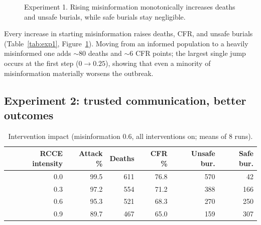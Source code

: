 \documentclass[11pt]{article}
\begin{document}
\begin{figure}[h]
\centering
{}
\caption{Experiment 1. Rising misinformation monotonically increases deaths and unsafe burials, while safe burials stay negligible.}
\label{fig:exp1}
\end{figure}

Every increase in starting misinformation raises deaths, CFR, and unsafe burials (Table~\ref{tab:exp1}, Figure~\ref{fig:exp1}). Moving from an informed population to a heavily misinformed one adds $\sim$80 deaths and $\sim$6 CFR points; the largest single jump occurs at the first step ($0\!\to\!0.25$), showing that even a minority of misinformation materially worsens the outbreak.

\subsection{Experiment 2: trusted communication, better outcomes}
\begin{table}[h]
\centering
\caption{Intervention impact (misinformation 0.6, all interventions on; means of 8 runs).}
\begin{tabular}{rrrrrr}
\toprule
RCCE intensity & Attack \% & Deaths & CFR \% & Unsafe bur. & Safe bur. \\
\midrule
0.0 & 99.5 & 611 & 76.8 & 570 & 42 \\
0.3 & 97.2 & 554 & 71.2 & 388 & 166 \\
0.6 & 95.3 & 521 & 68.3 & 270 & 250 \\
0.9 & 89.7 & 467 & 65.0 & 159 & 307 \\
\bottomrule
\end{tabular}
\label{tab:exp2}
\end{table}
\end{document}

